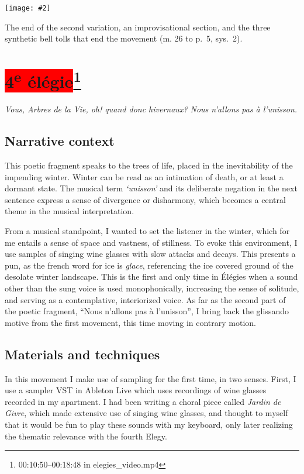 \documentclass[12pt,twoside,maitrise]{dms_ks}
\newcommand{\customincludeexamples}[4][]{%
    \begin{example}[H]
        \centering
        \texttt{[image: \#2]}
        \caption{#4}
	\label{#3} 
    \end{example}
}
\theoremstyle{definition}
\begin{document}
{{\customincludeexamples[width=\textwidth]{3e_4}{ex:3e_4}{The end of the second variation, an improvisational section, and the three synthetic bell tolls that end the movement (m. 26 to p.~5, sys.~2).}

\section{\colorbox{red}{4\textsuperscript{e} élégie}\footnote{00:10:50--00:18:48 in elegies\_video.mp4}}

\epigraph{\textit{Vous, Arbres de la Vie, oh! quand donc hivernaux? Nous n'allons pas à l'unisson.}}{}

\subsection{Narrative context}

This poetic fragment speaks to the trees of life, placed in the inevitability of the impending winter.
Winter can be read as an intimation of death, or at least a dormant state.
The musical term \textit{`unisson'} and its deliberate negation in the next sentence express a sense of divergence or disharmony, which becomes a central theme in the musical interpretation.

From a musical standpoint, I wanted to set the listener in the winter, which for me entails a sense of space and vastness, of stillness.
To evoke this environment, I use samples of singing wine glasses with slow attacks and decays.
This presents a pun, as the french word for ice is \textit{glace}, referencing the ice covered ground of the desolate winter landscape.
This is the first and only time in Élégies when a sound other than the sung voice is used monophonically, increasing the sense of solitude, and serving as a contemplative, interiorized voice.
As far as the second part of the poetic fragment, “Nous n'allons pas à l'unisson”, I bring back the glissando motive from the first movement, this time moving in contrary motion.

\subsection{Materials and techniques}

In this movement I make use of sampling for the first time, in two senses.
First, I use a sampler VST in Ableton Live which uses recordings of wine glasses recorded in my apartment.
I had been writing a choral piece called \textit{Jardin de Givre}, which made extensive use of singing wine glasses, and thought to myself that it would be fun to play these sounds with my keyboard, only later realizing the thematic relevance with the fourth Elegy.

}}
\end{document}
